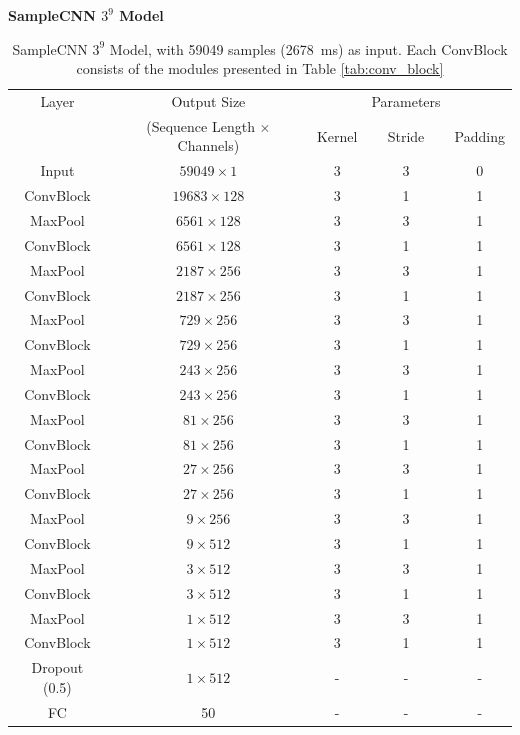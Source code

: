 \begin{fullwidth}
    \begin{table}[t]
        \centering
        \textbf{SampleCNN $3^9$ Model} \\
        \begin{tabular}{ccccc}
            \toprule Layer & Output Size & & Parameters & \\
            & (Sequence Length $\times$ Channels) & Kernel & Stride & Padding \\\hline
            Input & $59049 \times 1$ & 3 & 3 & 0 \\\hline
            ConvBlock & $19683 \times 128$ & 3 & 1 & 1 \\
            MaxPool & $6561 \times 128$ & 3 & 3 & 1 \\\hline
            ConvBlock & $6561 \times 128$ & 3 & 1 & 1 \\
            MaxPool & $2187 \times 256$ & 3 & 3 & 1 \\\hline
            ConvBlock & $2187 \times 256$ & 3 & 1 & 1 \\
            MaxPool & $729 \times 256$ & 3 & 3 & 1 \\\hline
            ConvBlock & $729 \times 256$ & 3 & 1 & 1 \\
            MaxPool & $243 \times 256$ & 3 & 3 & 1 \\\hline
            ConvBlock & $243 \times 256$ & 3 & 1 & 1 \\
            MaxPool & $81 \times 256$ & 3 & 3 & 1 \\\hline
            ConvBlock & $81 \times 256$ & 3 & 1 & 1 \\
            MaxPool & $27 \times 256$ & 3 & 3 & 1 \\\hline
            ConvBlock & $27 \times 256$ & 3 & 1 & 1 \\
            MaxPool & $9 \times 256$ & 3 & 3 & 1 \\\hline
            ConvBlock & $9 \times 512$ & 3 & 1 & 1 \\
            MaxPool & $3 \times 512$ & 3 & 3 & 1 \\\hline
            ConvBlock & $3 \times 512$ & 3 & 1 & 1 \\
            MaxPool & $1 \times 512$ & 3 & 3 & 1 \\\hline
            ConvBlock & $1 \times 512$ & 3 & 1 & 1 \\
            Dropout (0.5) & $1 \times 512$ & - & - & - \\\hline
            FC & 50 & - & - & - \\
            \bottomrule
        \end{tabular}
        \caption{SampleCNN $3^9$ Model, with 59049 samples (2678~ms) as input.
Each ConvBlock consists of the modules presented in Table \ref{tab:conv_block}}
        \label{tab:samplecnn_model}
    \end{table}
\end{fullwidth}


